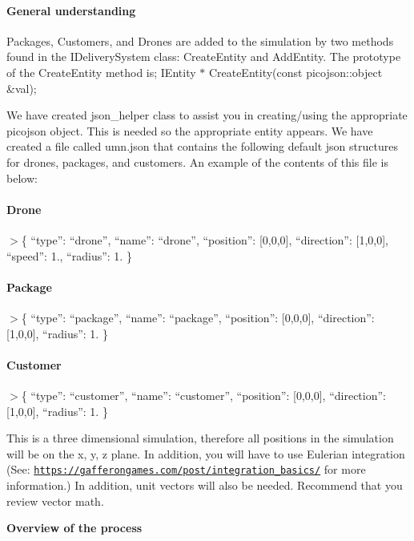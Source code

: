 \paragraph*{General understanding}

Packages, Customers, and Drones are added to the simulation by two methods found in the I\+Delivery\+System class\+: Create\+Entity and Add\+Entity. The prototype of the Create\+Entity method is; I\+Entity $\ast$ Create\+Entity(const picojson\+::object \&val);

We have created json\+\_\+helper class to assist you in creating/using the appropriate picojson object. This is needed so the appropriate entity appears. We have created a file called umn.\+json that contains the following default json structures for drones, packages, and customers. An example of the contents of this file is below\+:

\paragraph*{Drone}

$>$\{ “type”\+: “drone”, “name”\+: “drone”, “position”\+: \mbox{[}0,0,0\mbox{]}, “direction”\+: \mbox{[}1,0,0\mbox{]}, “speed”\+: 1., “radius”\+: 1. \}

\paragraph*{Package}

$>$\{ “type”\+: “package”, “name”\+: “package”, “position”\+: \mbox{[}0,0,0\mbox{]}, “direction”\+: \mbox{[}1,0,0\mbox{]}, “radius”\+: 1. \}

\paragraph*{Customer}

$>$\{ “type”\+: “customer”, “name”\+: “customer”, “position”\+: \mbox{[}0,0,0\mbox{]}, “direction”\+: \mbox{[}1,0,0\mbox{]}, “radius”\+: 1. \}

This is a three dimensional simulation, therefore all positions in the simulation will be on the x, y, z plane. In addition, you will have to use Eulerian integration (See\+: \href{https://gafferongames.com/post/integration_basics/}{\tt https\+://gafferongames.\+com/post/integration\+\_\+basics/} for more information.) In addition, unit vectors will also be needed. Recommend that you review vector math.

{\bfseries Overview of the process}

